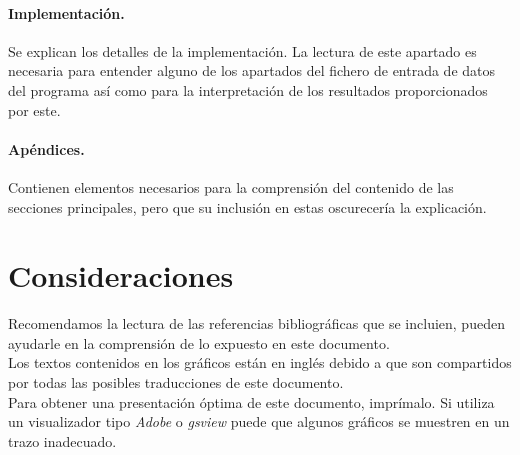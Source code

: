 \paragraph{Implementaci\'on.} Se explican los detalles de la implementaci\'on.
La lectura de este apartado es necesaria para entender alguno de los apartados
del fichero de entrada de datos del programa as\'i como para la interpretaci\'on
de los resultados proporcionados por este.

\paragraph{Ap\'endices.} Contienen elementos necesarios para la comprensi\'on
del contenido de las secciones principales, pero que su inclusi\'on en estas 
oscurecer\'ia la explicaci\'on.

\section{Consideraciones}

Recomendamos la lectura de las referencias bibliogr\'aficas que se incluien, 
pueden ayudarle en la comprensi\'on de lo expuesto en este documento.\\

Los textos contenidos en los gr\'aficos est\'an en ingl\'es debido a que son 
compartidos por todas las posibles traducciones de este documento.\\

Para obtener una presentaci\'on \'optima de este documento, impr\'imalo. Si 
utiliza un visualizador tipo \emph{Adobe} o \emph{gsview} puede que algunos
gr\'aficos se muestren en un trazo inadecuado.

